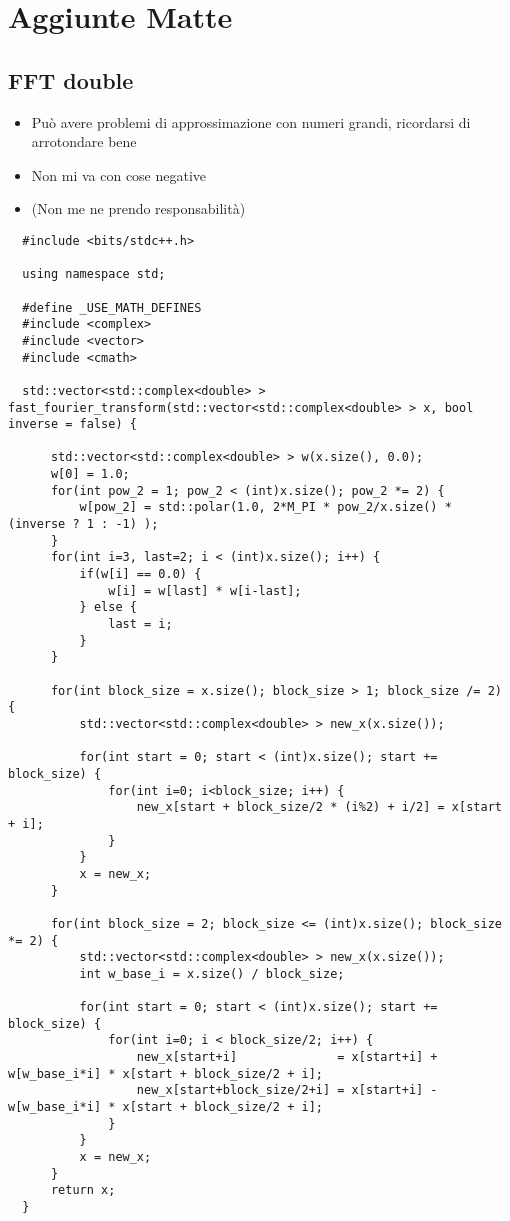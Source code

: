 \section{Aggiunte Matte}

\subsection{FFT double}
\begin{itemize}
    \item Può avere problemi di approssimazione con numeri grandi, ricordarsi di arrotondare bene
    \item Non mi va con cose negative
    \item (Non me ne prendo responsabilità)
\end{itemize}
\begin{lstlisting}
  #include <bits/stdc++.h>

  using namespace std;

  #define _USE_MATH_DEFINES
  #include <complex>
  #include <vector>
  #include <cmath>

  std::vector<std::complex<double> > fast_fourier_transform(std::vector<std::complex<double> > x, bool inverse = false) {

      std::vector<std::complex<double> > w(x.size(), 0.0);
      w[0] = 1.0;
      for(int pow_2 = 1; pow_2 < (int)x.size(); pow_2 *= 2) {
          w[pow_2] = std::polar(1.0, 2*M_PI * pow_2/x.size() * (inverse ? 1 : -1) );
      }
      for(int i=3, last=2; i < (int)x.size(); i++) {
          if(w[i] == 0.0) {
              w[i] = w[last] * w[i-last];
          } else {
              last = i;
          }
      }

      for(int block_size = x.size(); block_size > 1; block_size /= 2) {
          std::vector<std::complex<double> > new_x(x.size());

          for(int start = 0; start < (int)x.size(); start += block_size) {
              for(int i=0; i<block_size; i++) {
                  new_x[start + block_size/2 * (i%2) + i/2] = x[start + i];
              }
          }
          x = new_x;
      }

      for(int block_size = 2; block_size <= (int)x.size(); block_size *= 2) {
          std::vector<std::complex<double> > new_x(x.size());
          int w_base_i = x.size() / block_size;

          for(int start = 0; start < (int)x.size(); start += block_size) {
              for(int i=0; i < block_size/2; i++) {
                  new_x[start+i]              = x[start+i] + w[w_base_i*i] * x[start + block_size/2 + i];
                  new_x[start+block_size/2+i] = x[start+i] - w[w_base_i*i] * x[start + block_size/2 + i];
              }
          }
          x = new_x;
      }
      return x;
  }
  

\end{lstlisting}
